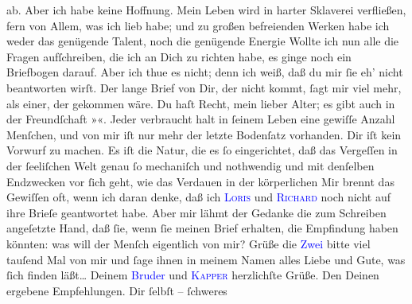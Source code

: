                ab. Aber ich habe keine Hoffnung. Mein Leben wird in harter Sklaverei verfließen,
               fern von Allem, was ich lieb habe; und zu großen befreienden Werken habe ich weder
               das genügende Talent, noch die genügende Energie{\dotsfive}\pend
           \pstart
           Wollte ich nun alle die Fragen aufſchreiben, die ich an Dich zu richten habe, es
               ginge noch ein Briefbogen darauf. Aber ich thue es nicht; denn ich weiß, daß du mir
               ſie eh’ nicht beantworten wirſt. Der lange Brief\strikeout{,} von
               Dir, der nicht kommt, ſagt mir viel mehr, als 
               einer, der gekom{\pb}men wäre. Du haſt Recht, mein
               lieber Alter; es gibt auch in der Freundſchaft »\label{K_L02669-45v}\label{K_L02669-45h}«. Jeder verbraucht halt in ſeinem Leben eine gewiſſe Anzahl Menſchen, und von
               mir iſt nur mehr der letzte Bodenſatz vorhanden. Dir iſt kein Vorwurf zu machen. Es
               iſt die Natur, die es ſo eingerichtet, daß das Vergeſſen in der ſeeliſchen Welt genau
               ſo  mechaniſch und nothwendig und mit denſelben
               Endzwecken vor ſich geht, wie das Verdauen in der körperlichen{\dotsfour}\pend
           \pstart
           Mir brennt das Gewiſſen oft, wenn ich daran denke, daß ich \textsc{\textcolor{blue}{Loris}{}\ledrightnote{\textcolor{blue}{Hugo von Hofmannsthal}}} und \textsc{\textcolor{blue}{Richard}{}\ledrightnote{\textcolor{blue}{Richard Beer-Hofmann}}} noch nicht auf ihre Brieſe geantwortet habe. Aber mir lähmt der Gedanke die zum
               Schreiben angeſetzte Hand, daß ſie, wenn ſie meinen Brief erhalten, die Empfindung
               haben könnten: was will der Menſch eigentlich von mir? Grüße die \textcolor{blue}{Zwei}{} bitte viel {\pb}tauſend Mal von mir und ſage ihnen in meinem Namen
               alles Liebe und Gute, was ſich finden läßt{\dots}\pend
           \pstart
           Deinem \textcolor{blue}{Bruder}{} und \textsc{\textcolor{blue}{Kapper}{}\ledrightnote{\textcolor{blue}{Friedrich Kapper}}} herzlichſte Grüße. Den Deinen ergebene Empfehlungen. Dir ſelbſt – ſchweres
